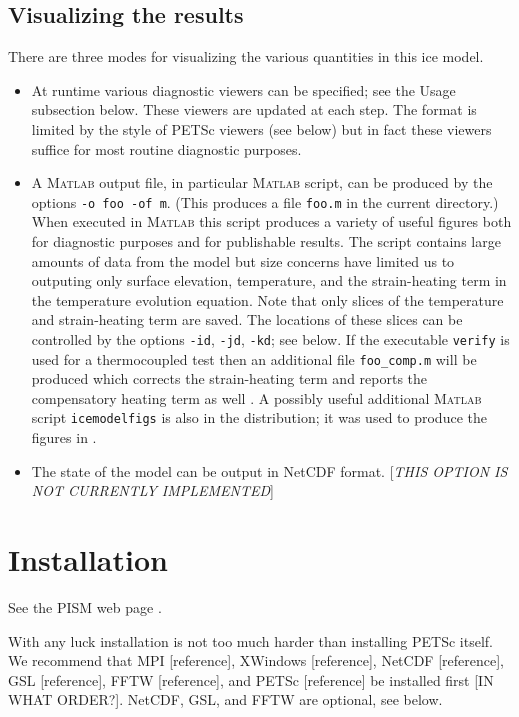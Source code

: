 \documentclass[11pt,final]{amsart}
\newcommand{\Matlab}{\textsc{Matlab}\xspace}
\begin{document}
\subsection{Visualizing the results}  There are three modes for visualizing the various quantities in this ice model.\begin{itemize}
\item At runtime various diagnostic viewers can be specified; see the Usage subsection below.  These viewers are updated at each step.  The format is limited by the style of PETSc viewers (see below) but in fact these viewers suffice for most routine diagnostic purposes.
\item A \Matlab output file, in particular \Matlab script, can be produced by the options \verb|-o foo -of m|.  (This produces a file \verb|foo.m| in the current directory.)  When executed in \Matlab this script produces a variety of useful figures both for diagnostic purposes and for publishable results.  The script contains large amounts of data from the model but size concerns have limited us to outputing only surface elevation, temperature, and the strain-heating term in the temperature evolution equation.  Note that only slices of the temperature and strain-heating term are saved.  The locations of these slices can be controlled by the options \verb|-id|, \verb|-jd|, \verb|-kd|; see below.  If the executable \verb|verify| is used for a thermocoupled test then an additional file \verb|foo_comp.m| will be produced which corrects the strain-heating term and reports the compensatory heating term as well \cite{BKL}.  A possibly useful additional \Matlab script \verb|icemodelfigs| is also in the distribution; it was used to produce the figures in \cite{BKL}.
\item The state of the model can be output in NetCDF format.  [\emph{THIS OPTION IS NOT CURRENTLY IMPLEMENTED}]
\end{itemize}


\section{Installation}

See the PISM web page \cite{pism-web-page}.

With any luck installation is not too much harder than installing PETSc itself.  We recommend that MPI [reference], XWindows [reference], NetCDF [reference], GSL [reference], FFTW [reference], and PETSc [reference] be installed first [IN WHAT ORDER?].  NetCDF, GSL, and FFTW are optional, see below.
\end{document}
